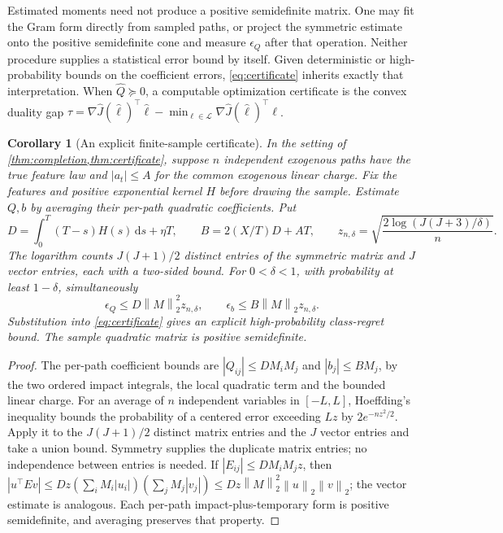 \documentclass[11pt]{article}
\newcommand{\norm}[1]{\left\lVert #1\right\rVert}
\numberwithin{equation}{section}
\newtheorem{corollary}[theorem]{Corollary}
\theoremstyle{definition}
\theoremstyle{remark}
\theoremstyle{definition}
\newcommand{\dd}{\,\mathrm d}
\begin{document}
Estimated moments need not produce a positive semidefinite matrix. One may
fit the Gram form directly from sampled paths, or project the symmetric
estimate onto the positive semidefinite cone and measure $\epsilon_Q$ after
that operation. Neither procedure supplies a statistical error bound by
itself. Given deterministic or high-probability bounds on the coefficient
errors, \eqref{eq:certificate} inherits exactly that interpretation. When
$\widehat Q\succeq0$, a computable optimization certificate is the convex
duality gap
$\tau=\nabla\widehat J(\widehat\ell)^\top\widehat\ell-
\min_{\ell\in\mathcal L}\nabla\widehat J(\widehat\ell)^\top\ell$.

\begin{corollary}[An explicit finite-sample certificate]\label{cor:samplecertificate}
In the setting of \cref{thm:completion,thm:certificate}, suppose
$n$ independent exogenous paths have the
true feature law and $|a_t|\le A$ for the common exogenous linear charge.
Fix the features and positive exponential kernel $H$ before drawing the sample.
Estimate $Q,b$ by averaging their
per-path quadratic coefficients. Put
\[
 D=\int_0^T(T-s)H(s)\dd s+\eta T,\qquad
 B=2(X/T)D+AT,\qquad
 z_{n,\delta}=\sqrt{\frac{2\log(J(J+3)/\delta)}n}.
\]
The logarithm counts $J(J+1)/2$ distinct entries of the symmetric
matrix and $J$ vector entries, each with a two-sided bound.
For $0<\delta<1$, with probability at least $1-\delta$, simultaneously
\begin{equation}\label{eq:samplecertificate}
 \epsilon_Q\le D\norm M_2^2z_{n,\delta},\qquad
 \epsilon_b\le B\norm M_2z_{n,\delta}.
\end{equation}
Substitution into \eqref{eq:certificate} gives an explicit high-probability
class-regret bound. The sample quadratic matrix is positive semidefinite.
\end{corollary}
\begin{proof}
The per-path coefficient bounds are
$|Q_{ij}|\le D M_iM_j$ and $|b_j|\le B M_j$, by the two ordered impact
integrals, the local quadratic term and the bounded linear charge. For an
average of $n$ independent variables in $[-L,L]$, Hoeffding's inequality
\citep{hoeffding1963} bounds the probability of a centered error exceeding
$Lz$ by $2e^{-nz^2/2}$. Apply it to the $J(J+1)/2$ distinct matrix
entries and the $J$ vector entries and take a union bound. Symmetry supplies
the duplicate matrix entries; no independence between entries is needed.
If $|E_{ij}|\le D M_iM_j z$, then
$|u^\top E v|\le Dz(\sum_iM_i|u_i|)(\sum_jM_j|v_j|)
\le Dz\norm M_2^2\norm u_2\norm v_2$; the vector estimate is analogous.
Each per-path impact-plus-temporary form is positive semidefinite, and
averaging preserves that property.
\end{proof}
\end{document}
